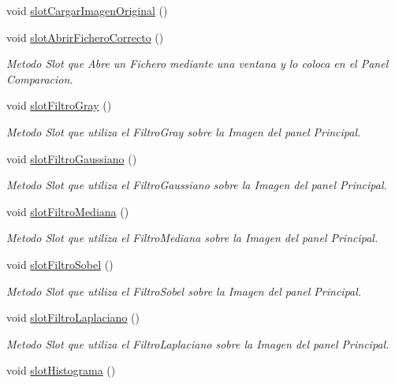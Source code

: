 \begin{DoxyCompactItemize}
void \hyperlink{classCAplicacion_a7f655c9e187d1ac28223b6bac96fd61c}{slot\+Cargar\+Imagen\+Original} ()
\item 
void \hyperlink{classCAplicacion_a54ab1051a4cfd1a26b4081032dac96e0}{slot\+Abrir\+Fichero\+Correcto} ()
\begin{DoxyCompactList}\small\item\em Metodo Slot que Abre un Fichero mediante una ventana y lo coloca en el Panel Comparacion. \end{DoxyCompactList}\item 
void \hyperlink{classCAplicacion_a23aca6a757d7a6ce849ad52719c361f8}{slot\+Filtro\+Gray} ()
\begin{DoxyCompactList}\small\item\em Metodo Slot que utiliza el Filtro\+Gray sobre la Imagen del panel Principal. \end{DoxyCompactList}\item 
void \hyperlink{classCAplicacion_a7f09b7c407550f26bf9cf9300bfe6697}{slot\+Filtro\+Gaussiano} ()
\begin{DoxyCompactList}\small\item\em Metodo Slot que utiliza el Filtro\+Gaussiano sobre la Imagen del panel Principal. \end{DoxyCompactList}\item 
void \hyperlink{classCAplicacion_a767c2c2349db3fda16be49d16ed75e78}{slot\+Filtro\+Mediana} ()
\begin{DoxyCompactList}\small\item\em Metodo Slot que utiliza el Filtro\+Mediana sobre la Imagen del panel Principal. \end{DoxyCompactList}\item 
void \hyperlink{classCAplicacion_ac3f97714202113dc2dad77c0cea45618}{slot\+Filtro\+Sobel} ()
\begin{DoxyCompactList}\small\item\em Metodo Slot que utiliza el Filtro\+Sobel sobre la Imagen del panel Principal. \end{DoxyCompactList}\item 
void \hyperlink{classCAplicacion_ac0602f9cf86587560767791eed28585b}{slot\+Filtro\+Laplaciano} ()
\begin{DoxyCompactList}\small\item\em Metodo Slot que utiliza el Filtro\+Laplaciano sobre la Imagen del panel Principal. \end{DoxyCompactList}\item 
void \hyperlink{classCAplicacion_ae2c3ba106bbe32c000f886172c116c7a}{slot\+Histograma} ()

\end{DoxyCompactItemize}
